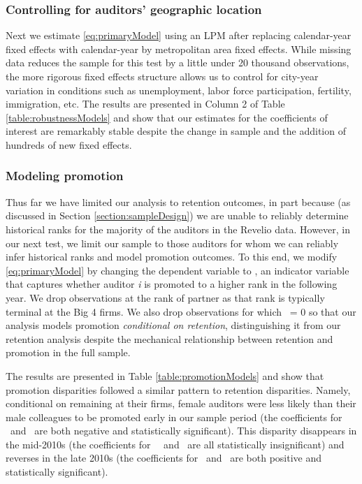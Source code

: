 \documentclass[11pt]{article}
\begin{document}
        \subsubsection{Controlling for auditors' geographic location}\label{section:locationControls}
            Next we estimate \ref{eq:primaryModel} using an LPM after replacing calendar-year fixed effects with calendar-year by metropolitan area fixed effects. While missing data reduces the sample for this test by a little under 20 thousand observations, the more rigorous fixed effects structure allows us to control for city-year variation in conditions such as unemployment, labor force participation, fertility, immigration, etc. The results are presented in Column 2 of Table \ref{table:robustnessModels} and show that our estimates for the coefficients of interest are remarkably stable despite the change in sample and the addition of hundreds of new fixed effects. 

        \subsubsection{Modeling promotion}\label{section:promotionModel}
            Thus far we have limited our analysis to retention outcomes, in part because (as discussed in Section \ref{section:sampleDesign}) we are unable to reliably determine historical ranks for the majority of the auditors in the Revelio data. However, in our next test, we limit our sample to those auditors for whom we can reliably infer historical ranks and model promotion outcomes. To this end, we modify \ref{eq:primaryModel} by changing the dependent variable to \PROMOTED, an indicator variable that captures whether auditor \textit{i} is promoted to a higher rank in the following year. We drop observations at the rank of partner as that rank is typically terminal at the Big 4 firms. We also drop observations for which \RETAINED\ = 0 so that our analysis models promotion \textit{conditional on retention}, distinguishing it from our retention analysis despite the mechanical relationship between retention and promotion in the full sample.  
            
            The results are presented in Table \ref{table:promotionModels} and show that promotion disparities followed a similar pattern to retention disparities. Namely, conditional on remaining at their firms, female auditors were less likely than their male colleagues to be promoted early in our sample period (the coefficients for \FEMALExPREX\ and \FEMALExXtoXI\ are both negative and statistically significant). This disparity disappears in the mid-2010s (the coefficients for \FEMALExXIItoXIII\, \FEMALExXIVtoXV\ and \FEMALExXVItoXVII\ are all statistically insignificant) and reverses in the late 2010s (the coefficients for \FEMALExXVIIItoXIX\ and \FEMALExPOSTXIX\ are both positive and statistically significant).
            
\end{document}
